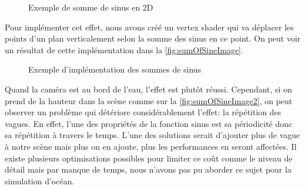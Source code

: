 \begin{figure}[H]
	\hskip 5pt
	\caption{Exemple de somme de sinus en 2D}
	\label{fig:sumOfSinePlot}
\end{figure}

Pour implémenter cet effet, nous avons créé un vertex shader qui va déplacer les points d'un plan verticalement selon la somme des sinus en ce point. On peut voir un résultat de cette implémentation dans la \autoref{fig:sumOfSineImage}.

\begin{figure}[H]			
	\caption{Exemple d'implémentation des sommes de sinus}
	\label{fig:sumOfSineImage}
\end{figure}

Quand la caméra est au bord de l'eau, l'effet est plutôt réussi. Cependant, si on prend de la hauteur dans la scène comme sur la \autoref{fig:sumOfSineImage2}, on peut observer un problème qui détériore considérablement l'effet: la répétition des vagues. En effet, l'une des propriétés de la fonction sinus est sa périodicité donc sa répétition à travers le temps. L'une des solutions serait d'ajouter plus de vague à notre scène mais plus on en ajoute, plus les performances en seront affectées. Il existe plusieurs optimisations possibles pour limiter ce coût comme le niveau de détail mais par manque de temps, nous n'avons pas pu aborder ce sujet pour la simulation d'océan.

